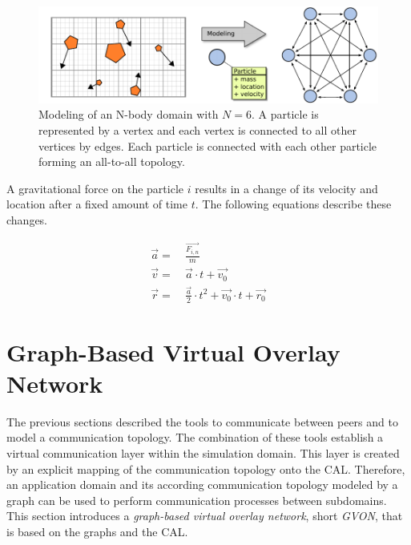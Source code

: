 \begin{figure}[H]
  \centering \includegraphics[width=\textwidth]{graphics/30_nbody_modeling}
  \caption{Modeling of an N-body domain with $N = 6$. A particle is
    represented by a vertex and each vertex is connected to all other
    vertices by edges. Each particle is connected with each other
    particle forming an all-to-all topology.}
  \label{fig:nbody_modeling}
\end{figure}

\noindent A gravitational force on the particle $i$ results in a change of its velocity and
location after a fixed amount of time $t$. The following equations describe these
changes.

\begin{align}
  \label{eq:n_body_update}
  \overrightarrow{a} =&~ \frac{\overrightarrow{F_{i,n}}}{m}\\
  \overrightarrow{v} =&~ \overrightarrow{a} \cdot t + \overrightarrow{v_0}\\
  \overrightarrow{r} =&~ \frac{\overrightarrow{a}}{2} \cdot t^2 + \overrightarrow{v_0} \cdot t + \overrightarrow{r_0}
\end{align}


\section{Graph-Based Virtual Overlay Network}
\label{sec:gvon}
The previous sections described the tools to communicate between
peers and to model a communication topology. The combination of these
tools establish a virtual communication layer within the simulation
domain. This layer is created by an explicit mapping of the
communication topology onto the CAL. Therefore, an application domain and its according
communication topology modeled by a graph can be used to perform
communication processes between subdomains.  This section introduces a
\emph{graph-based virtual overlay network}, short \emph{GVON},
that is based on the graphs and the CAL.

